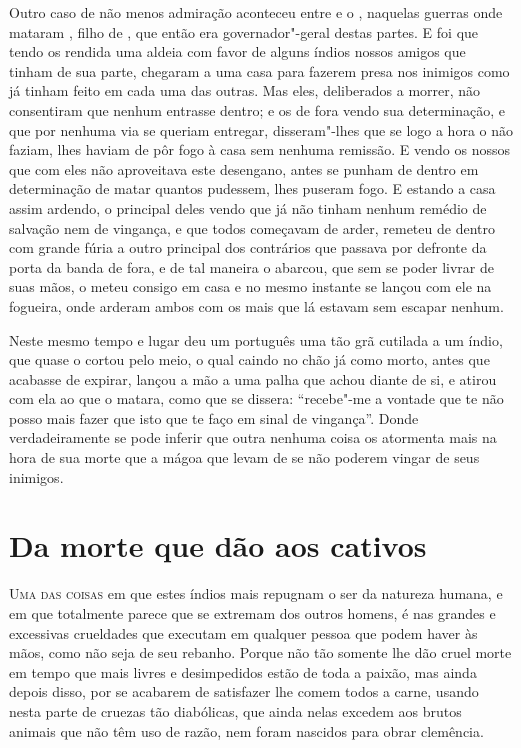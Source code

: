 Outro caso de não menos admiração aconteceu entre  e o
, naquelas guerras onde mataram , filho de , que então era governador"-geral destas partes. E foi que tendo os
 rendida uma aldeia com favor de alguns índios nossos amigos que
tinham de sua parte, chegaram a uma casa para fazerem presa nos inimigos
como já tinham feito em cada uma das outras. Mas eles, deliberados a
morrer, não consentiram que nenhum entrasse dentro; e os de fora vendo
sua determinação, e que por nenhuma via se queriam entregar,
disseram"-lhes que se logo a hora o não faziam, lhes haviam de pôr fogo à
casa sem nenhuma remissão. E vendo os nossos que com eles não
aproveitava este desengano, antes se punham de dentro em determinação
de matar quantos pudessem, lhes puseram fogo. E estando a casa assim
ardendo, o principal deles vendo que já não tinham nenhum remédio de			%
salvação nem de vingança, e que todos começavam de arder, remeteu de
dentro com grande fúria a outro principal dos contrários que passava
por defronte da porta da banda de fora, e de tal maneira o abarcou, que
sem se poder livrar de suas mãos, o meteu consigo em casa e no mesmo
instante se lançou com ele na fogueira, onde arderam ambos com os mais
que lá estavam sem escapar nenhum.

Neste mesmo tempo e lugar deu um português uma tão grã cutilada a um
índio, que quase o cortou pelo meio, o qual caindo no chão já como			
morto, antes que acabasse de expirar, lançou a mão a uma palha que achou
diante de si, e atirou com ela ao que o matara, como que se dissera: ``recebe"-me 
a vontade que te não posso mais fazer que isto que te faço em
sinal de vingança''. Donde verdadeiramente se pode inferir que outra
nenhuma coisa os atormenta mais na hora de sua morte que a mágoa 
que levam de se não poderem vingar de seus inimigos.

\chapter[Da morte que dão aos cativos]{Da morte que dão aos cativos} 

\noindent\textsc{Uma das coisas} em que estes índios mais repugnam o ser da natureza
humana, e em que totalmente parece que se extremam dos outros homens, é
nas grandes e excessivas crueldades que executam em qualquer pessoa que
podem haver às mãos, como não seja de seu rebanho. Porque não tão
somente lhe dão cruel morte em tempo que mais livres e desimpedidos
estão de toda a paixão, mas ainda depois disso, por se acabarem de			%
satisfazer lhe comem todos a carne, usando nesta parte de cruezas tão			%
diabólicas, que ainda nelas excedem aos brutos animais que não têm uso
de razão, nem foram nascidos para obrar clemência. 

